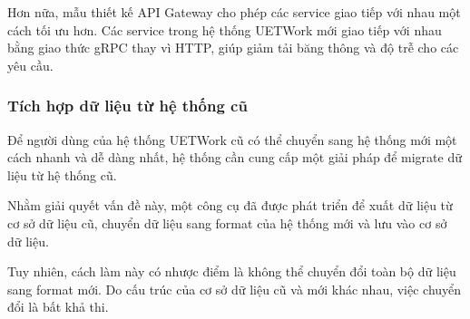 \documentclass[./../main.tex]{subfiles}
\begin{document}
Hơn nữa, mẫu thiết kế API Gateway cho phép các service giao tiếp với nhau một cách tối ưu hơn. Các service trong hệ thống UETWork mới giao tiếp với nhau bằng giao thức gRPC thay vì HTTP, giúp giảm tải băng thông và độ trễ cho các yêu cầu.

\subsubsection{Tích hợp dữ liệu từ hệ thống cũ}

Để người dùng của hệ thống UETWork cũ có thể chuyển sang hệ thống mới một cách nhanh và dễ dàng nhất, hệ thống cần cung cấp một giải pháp để migrate dữ liệu từ hệ thống cũ.

Nhằm giải quyết vấn đề này, một công cụ đã được phát triển để xuất dữ liệu từ cơ sở dữ liệu cũ, chuyển dữ liệu sang format của hệ thống mới và lưu vào cơ sở dữ liệu.

Tuy nhiên, cách làm này có nhược điểm là không thể chuyển đổi toàn bộ dữ liệu sang format mới. Do cấu trúc của cơ sở dữ liệu cũ và mới khác nhau, việc chuyển đổi là bất khả thi.
\end{document}
